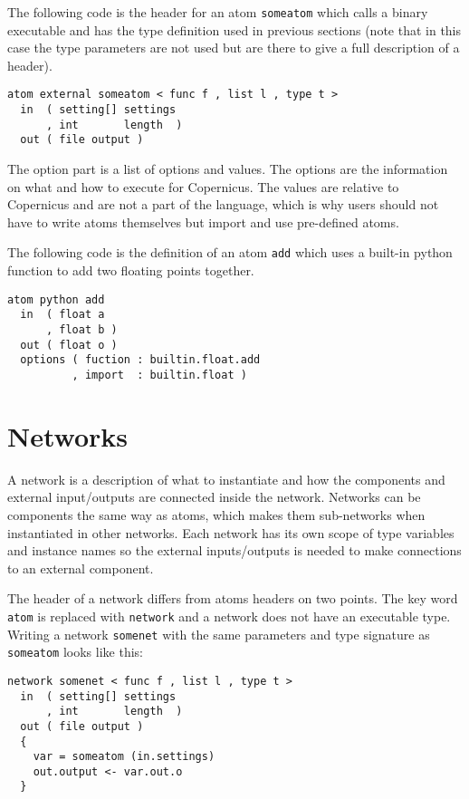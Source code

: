 The following code is the header for an atom \verb#someatom# which
calls a binary executable and has the type definition used in previous
sections (note that in this case the type parameters are not used but
are there to give a full description of a header).

\begin{verbatim}
atom external someatom < func f , list l , type t >
  in  ( setting[] settings
      , int       length  )
  out ( file output )
\end{verbatim}

The option part is a list of options and values. The options are the
information on what and how to execute for Copernicus. The values are
relative to Copernicus and are not a part of the language, which is
why users should not have to write atoms themselves but import and use
pre-defined atoms.

The following code is the definition of an atom \verb#add# which uses
a built-in python function to add two floating points together.

\begin{verbatim}
atom python add
  in  ( float a
      , float b )
  out ( float o )
  options ( fuction : builtin.float.add
          , import  : builtin.float )
\end{verbatim}

\section{Networks}\label{sec:net}
A network is a description of what to instantiate and how the
components and external input/outputs are connected inside the
network. Networks can be components the same way as atoms, which makes
them sub-networks when instantiated in other networks. Each network has
its own scope of type variables and instance names so the external
inputs/outputs is needed to make connections to an external component.

The header of a network differs from atoms headers on two points. The
key word \verb#atom# is replaced with \verb#network# and a network
does not have an executable type. Writing a network \verb#somenet#
with the same parameters and type signature as \verb#someatom# looks
like this:

\begin{verbatim}
network somenet < func f , list l , type t >
  in  ( setting[] settings
      , int       length  )
  out ( file output )
  {
    var = someatom (in.settings)
    out.output <- var.out.o
  }
\end{verbatim}

